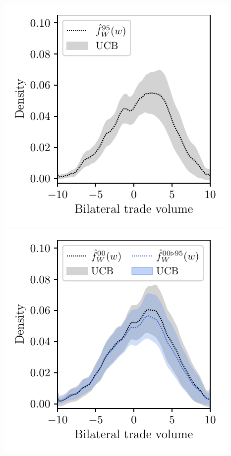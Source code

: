\documentclass{article}
\begin{document}
\includegraphics[scale=0.5]{graphics/trade_plot_1995.pdf}
\includegraphics[scale=0.5]{graphics/trade_plot_1995_2000.pdf}
\end{document}
